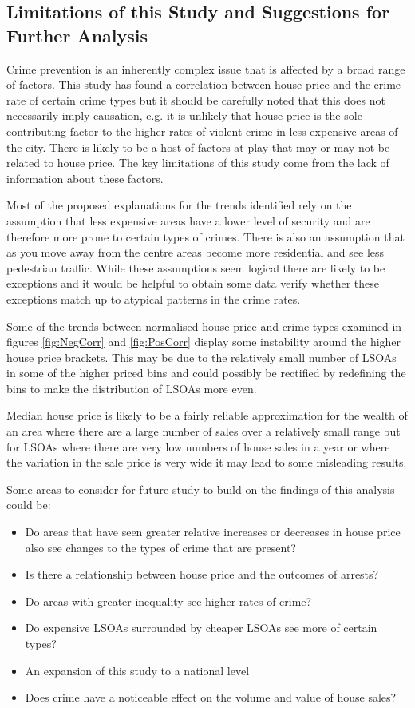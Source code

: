 \documentclass{article}
\begin{document}
\subsection{Limitations of this Study and Suggestions for Further Analysis} \label{Limitations of this Study and Suggestions for Further Analysis}

Crime prevention is an inherently complex issue that is affected by a broad range of factors. This study has found a correlation between house price and the crime rate of certain crime types but it should be carefully noted that this does not necessarily imply causation, e.g. it is unlikely that house price is the sole contributing factor to the higher rates of violent crime in less expensive areas of the city. There is likely to be a host of factors at play that may or may not be related to house price. The key limitations of this study come from the lack of information about these factors. 

Most of the proposed explanations for the trends identified rely on the assumption that less expensive areas have a lower level of security and are therefore more prone to certain types of crimes. There is also an assumption that as you move away from the centre areas become more residential and see less pedestrian traffic. While these assumptions seem logical there are likely to be exceptions and it would be helpful to obtain some data verify whether these exceptions match up to atypical patterns in the crime rates. 

Some of the trends between normalised house price and crime types examined in figures \ref{fig:NegCorr} and \ref{fig:PosCorr} display some instability around the higher house price brackets. This may be due to the relatively small number of LSOAs in some of the higher priced bins and could possibly be rectified by redefining the bins to make the distribution of LSOAs more even.

Median house price is likely to be a fairly reliable approximation for the wealth of an area where there are a large number of sales over a relatively small range but for LSOAs where there are very low numbers of house sales in a year or where the variation in the sale price is very wide it may lead to some misleading results.
\newline

Some areas to consider for future study to build on the findings of this analysis could be:
\begin{itemize}
\item Do areas that have seen greater relative increases or decreases in house price also see changes to the types of crime that are present?
\item Is there a relationship between house price and the outcomes of arrests?
\item Do areas with greater inequality see higher rates of crime?
\item Do expensive LSOAs surrounded by cheaper LSOAs see more of certain types?
\item An expansion of this study to a national level
\item Does crime have a noticeable effect on the volume and value of house sales?
\end{itemize}
\end{document}
